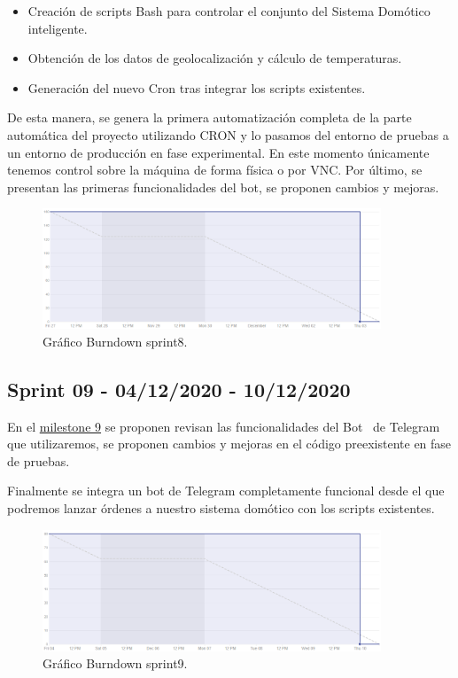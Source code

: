 \begin{itemize}
    \item Creación de scripts Bash para controlar el conjunto del Sistema Domótico inteligente.
    \item Obtención de los datos de geolocalización y cálculo de temperaturas.
    \item Generación del nuevo Cron tras integrar los scripts existentes.
\end{itemize}

De esta manera, se genera la primera automatización completa de la parte automática del proyecto utilizando CRON y lo pasamos del entorno de pruebas a un entorno de producción en fase experimental. En este momento únicamente tenemos control sobre la máquina de forma física o por VNC.
Por último, se presentan las primeras funcionalidades del bot, se proponen cambios y mejoras.

\begin{figure}[h]
    \centering
    \includegraphics[width=0.9\textwidth]{img/BurnDown/8.PNG}
    \caption{Gráfico Burndown sprint8. } \label{BD6}
\end{figure}

\subsection{Sprint 09 - 04/12/2020 - 10/12/2020}
En el \href{https://github.com/davidelinformatico/TFG/milestone/9?closed=1}{milestone 9} se proponen revisan las funcionalidades del Bot~\cite{misc:TelegramApi} de Telegram~\cite{misc:TelegramApp} que utilizaremos, se proponen cambios y mejoras en el código preexistente en fase de pruebas.

Finalmente se integra un bot de Telegram completamente funcional desde el que podremos lanzar órdenes a nuestro sistema domótico con los scripts existentes.
\begin{figure}[h]
    \centering
    \includegraphics[width=0.9\textwidth]{img/BurnDown/9.PNG}
    \caption{Gráfico Burndown sprint9. } \label{BD9}
\end{figure}
